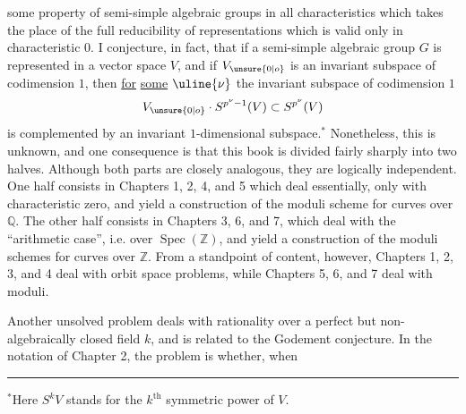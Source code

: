 
some property of semi-simple algebraic groups in all characteristics which takes the place of the full reducibility of representations which is valid only in characteristic $0$. I conjecture, in fact, that if a semi-simple algebraic group $G$ is represented in a vector space $V$, and if $V_{\unsure{0|o}}$ is an invariant subspace of codimension $1$, then \uline{for} \uline{some} $\uline{\nu}$ the invariant subspace of codimension $1$
\[
V_{\unsure{0|o}}\cdot S^{p^\nu-1}(V)\subset S^{p^\nu}(V)
\]
is complemented by an invariant $1$-dimensional subspace.$^*$ Nonetheless, this is unknown, and one consequence is that this book is divided fairly sharply into two halves. Although both parts are closely analogous, they are logically independent. One half consists in Chapters 1, 2, 4, and 5 which deal essentially, only with characteristic zero, and yield a construction of the moduli scheme for curves over $\mathbb Q$. The other half consists in Chapters 3, 6, and 7, which deal with the ``arithmetic case'', i.e. over $\operatorname{Spec}(\mathbb Z)$, and yield a construction of the moduli schemes for curves over $\mathbb Z$. From a standpoint of content, however, Chapters 1, 2, 3, and 4 deal with orbit space problems, while Chapters 5, 6, and 7 deal with moduli.

Another unsolved problem deals with rationality over a perfect but non-algebraically closed field $k$, and is related to the Godement conjecture. In the notation of Chapter 2, the problem is whether, when

\noindent\rule{2cm}{.4pt}

$^*$Here $S^kV$ stands for the $k^{\mathrm{th}}$ symmetric power of $V$.

